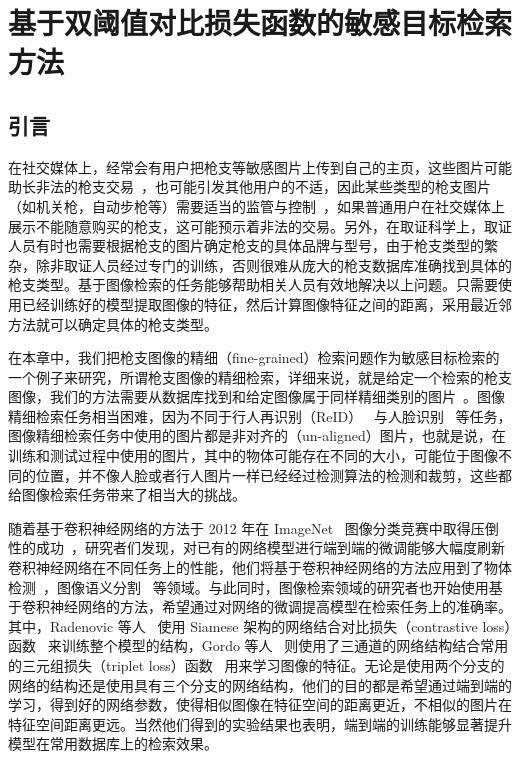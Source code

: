 
\chapter{基于双阈值对比损失函数的敏感目标检索方法}\label{chapter:double_margin}

\section{引言}
在社交媒体上，经常会有用户把枪支等敏感图片上传到自己的主页，这些图片可能助长非法的枪支交易~\cite{Drange2016,MELE2016FacebookBG}，也可能引发其他用户的不适，因此某些类型的枪支图片（如机关枪，自动步枪等）需要适当的监管与控制~\cite{Hsu2018Bumble}，如果普通用户在社交媒体上展示不能随意购买的枪支，这可能预示着非法的交易。另外，在取证科学上，取证人员有时也需要根据枪支的图片确定枪支的具体品牌与型号，由于枪支类型的繁杂，除非取证人员经过专门的训练，否则很难从庞大的枪支数据库准确找到具体的枪支类型。基于图像检索的任务能够帮助相关人员有效地解决以上问题。只需要使用已经训练好的模型提取图像的特征，然后计算图像特征之间的距离，采用最近邻方法就可以确定具体的枪支类型。

在本章中，我们把枪支图像的精细（fine-grained）检索问题作为敏感目标检索的一个例子来研究，所谓枪支图像的精细检索，详细来说，就是给定一个检索的枪支图像，我们的方法需要从数据库找到和给定图像属于同样精细类别的图片~\cite{Song2016DeepML,Wang2017DeepML}。图像精细检索任务相当困难，因为不同于行人再识别（ReID）~\cite{Zhao2013UnsupervisedSL,Li2014DeepReIDDF} 与人脸识别~\cite{Wen2016ADF,Taigman2014DeepFaceCT} 等任务，图像精细检索任务中使用的图片都是非对齐的（un-aligned）图片，也就是说，在训练和测试过程中使用的图片，其中的物体可能存在不同的大小，可能位于图像不同的位置，并不像人脸或者行人图片一样已经经过检测算法的检测和裁剪，这些都给图像检索任务带来了相当大的挑战。

随着基于卷积神经网络的方法于 2012 年在 ImageNet~\cite{Russakovsky2015ImageNetLS} 图像分类竞赛中取得压倒性的成功~\cite{Krizhevsky2012ImageNetCW}，研究者们发现，对已有的网络模型进行端到端的微调能够大幅度刷新卷积神经网络在不同任务上的性能，他们将基于卷积神经网络的方法应用到了物体检测~\cite{Liu2016SSDSS,Redmon2016YouOL,Lin2017FocalLF,Ren2017FasterRT}，图像语义分割~\cite{Shelhamer2017FullyCN,Chen2018DeepLabSI,Noh2015LearningDN} 等领域。与此同时，图像检索领域的研究者也开始使用基于卷积神经网络的方法，希望通过对网络的微调提高模型在检索任务上的准确率。其中，Radenovic 等人~\cite{Radenovic2016CNNIR} 使用 Siamese 架构的网络结合对比损失（contrastive loss）函数~\cite{Chopra2005LearningAS,Hadsell2006DimensionalityRB,Han2015MatchNetUF} 来训练整个模型的结构，Gordo 等人~\cite{Gordo2016DeepIR} 则使用了三通道的网络结构结合常用的三元组损失（triplet loss）函数~\cite{Schroff2015FaceNetAU,Wang2014LearningFI,G2016LearningLI,Weinberger2006DistanceML} 用来学习图像的特征。无论是使用两个分支的网络的结构还是使用具有三个分支的网络结构，他们的目的都是希望通过端到端的学习，得到好的网络参数，使得相似图像在特征空间的距离更近，不相似的图片在特征空间距离更远。当然他们得到的实验结果也表明，端到端的训练能够显著提升模型在常用数据库上的检索效果。

